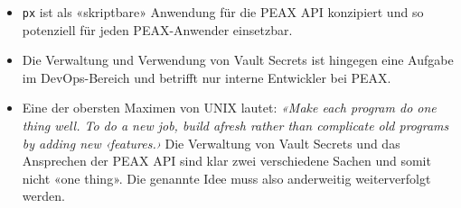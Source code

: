 \begin{itemize}
\begin{itemize}
        \item \texttt{px} ist als «skriptbare» Anwendung für die PEAX API konzipiert und so potenziell für jeden PEAX-Anwender einsetzbar.
        \item Die Verwaltung und Verwendung von Vault Secrets ist hingegen eine Aufgabe im DevOps-Bereich und betrifft nur interne Entwickler bei PEAX.
        \item Eine der obersten Maximen von UNIX lautet: \textit{«Make each program do one thing well. To do a new job, build afresh rather than complicate old programs by adding new ‹features.›} \cite[p. 3]{unixtimesharing} Die Verwaltung von Vault Secrets und das Ansprechen der PEAX API sind klar zwei verschiedene Sachen und somit nicht «one thing». Die genannte Idee muss also anderweitig weiterverfolgt werden.
    \end{itemize}
\end{itemize}

